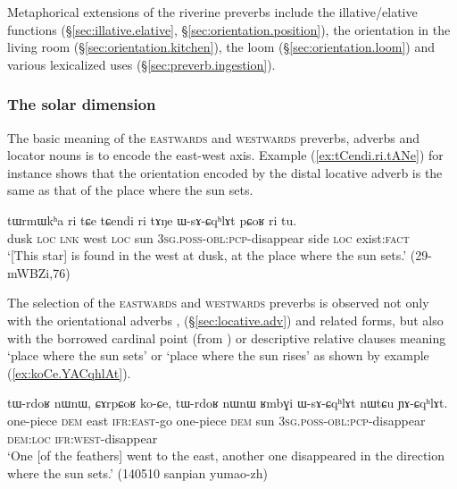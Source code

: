 Metaphorical extensions of the riverine preverbs include the illative/elative functions (§\ref{sec:illative.elative}, §\ref{sec:orientation.position}), the orientation in the living room (§\ref{sec:orientation.kitchen}), the loom (§\ref{sec:orientation.loom}) and various lexicalized uses (§\ref{sec:preverb.ingestion}).

\subsubsection{The solar dimension} \label{sec:solar.dimension} 
The basic meaning of the \textsc{eastwards} and \textsc{westwards} preverbs, adverbs and locator nouns is to encode the east-west axis. Example (\ref{ex:tCendi.ri.tANe}) for instance shows that the orientation encoded by the distal locative adverb  is the same as that of the place where the sun sets.

\begin{exe}
\ex \label{ex:tCendi.ri.tANe}
\gll  tɯrmɯkʰa ri tɕe tɕendi ri tɤŋe ɯ-sɤ-ɕqʰlɤt pɕoʁ ri tu. \\
dusk \textsc{loc} \textsc{lnk} west \textsc{loc} sun \textsc{3sg}.\textsc{poss}-\textsc{obl}:\textsc{pcp}-disappear side \textsc{loc} exist:\textsc{fact} \\
\glt `[This star] is found in the west at dusk, at the place where the sun sets.' (29-mWBZi,76)
\end{exe}

 The selection of the \textsc{eastwards} and \textsc{westwards} preverbs is observed not only with the orientational adverbs ,  (§\ref{sec:locative.adv}) and related forms, but also with the borrowed cardinal point  (from ) or  descriptive relative clauses meaning `place where the sun sets' or `place where the sun rises' as shown by example (\ref{ex:koCe.YACqhlAt}). 

\begin{exe}
\ex \label{ex:koCe.YACqhlAt}
\gll tɯ-rdoʁ nɯnɯ, ɕɤrpɕoʁ ko-ɕe, tɯ-rdoʁ nɯnɯ ʁmbɣi ɯ-sɤ-ɕqʰlɤt nɯtɕu ɲɤ-ɕqʰlɤt. \\
one-piece \textsc{dem} east \textsc{ifr}:\textsc{east}-go one-piece \textsc{dem} sun \textsc{3sg}.\textsc{poss}-\textsc{obl}:\textsc{pcp}-disappear \textsc{dem}:\textsc{loc} \textsc{ifr}:\textsc{west}-disappear \\
\glt `One [of the feathers] went to the east, another one disappeared in the direction where the sun sets.' (140510 sanpian yumao-zh) 	
\end{exe}

